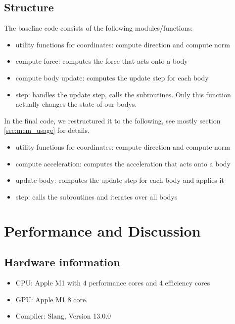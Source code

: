 \documentclass[a4paper]{scrartcl}
\begin{document}
    \subsection{Structure}
        The baseline code consists of the following modules/functions:
        \begin{itemize}
            \item utility functions for coordinates: compute direction and compute norm 
            \item compute force: computes the force that acts onto a body
            \item compute body update: computes the update step for each body
            \item step: handles the update step, calls the subroutines. Only this function actually changes the state of our bodys.
        \end{itemize}

        In the final code, we restructured it to the following, see mostly section \ref{sec:mem_usage} for details.
        \begin{itemize}
            \item utility functions for coordinates: compute direction and compute norm 
            \item compute acceleration: computes the acceleration that acts onto a body
            \item update body: computes the update step for each body and applies it
            \item step: calls the subroutines and iterates over all bodys
        \end{itemize}


\section{Performance and Discussion}

    \subsection{Hardware information}
        \begin{itemize}
            \item CPU: Apple M1 with 4 performance cores and 4 efficiency cores
            \item GPU: Apple M1 8 core.
            \item Compiler: Slang, Version 13.0.0
        \end{itemize}
\end{document}
